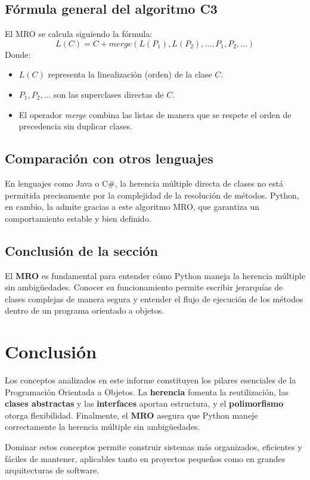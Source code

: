 \documentclass[12pt,a4paper]{article}
\begin{document}
\subsection*{Fórmula general del algoritmo C3}
El MRO se calcula siguiendo la fórmula:
\[
L(C) = C + merge(L(P_1), L(P_2), ..., P_1, P_2, ...)
\]
Donde:
\begin{itemize}
    \item \(L(C)\) representa la linealización (orden) de la clase \(C\).
    \item \(P_1, P_2, ...\) son las superclases directas de \(C\).
    \item El operador \textit{merge} combina las listas de manera que se respete el orden de precedencia sin duplicar clases.
\end{itemize}


\subsection*{Comparación con otros lenguajes}
En lenguajes como Java o C\#, la herencia múltiple directa de clases no está permitida precisamente por la complejidad de la resolución de métodos.  
Python, en cambio, la admite gracias a este algoritmo MRO, que garantiza un comportamiento estable y bien definido.

\subsection*{Conclusión de la sección}
El \textbf{MRO} es fundamental para entender cómo Python maneja la herencia múltiple sin ambigüedades.  
Conocer su funcionamiento permite escribir jerarquías de clases complejas de manera segura y entender el flujo de ejecución de los métodos dentro de un programa orientado a objetos.

\section{Conclusión}
Los conceptos analizados en este informe constituyen los pilares esenciales de la Programación Orientada a Objetos.  
La \textbf{herencia} fomenta la reutilización, las \textbf{clases abstractas} y las \textbf{interfaces} aportan estructura, y el \textbf{polimorfismo} otorga flexibilidad.  
Finalmente, el \textbf{MRO} asegura que Python maneje correctamente la herencia múltiple sin ambigüedades.

Dominar estos conceptos permite construir sistemas más organizados, eficientes y fáciles de mantener, aplicables tanto en proyectos pequeños como en grandes arquitecturas de software.
\end{document}
